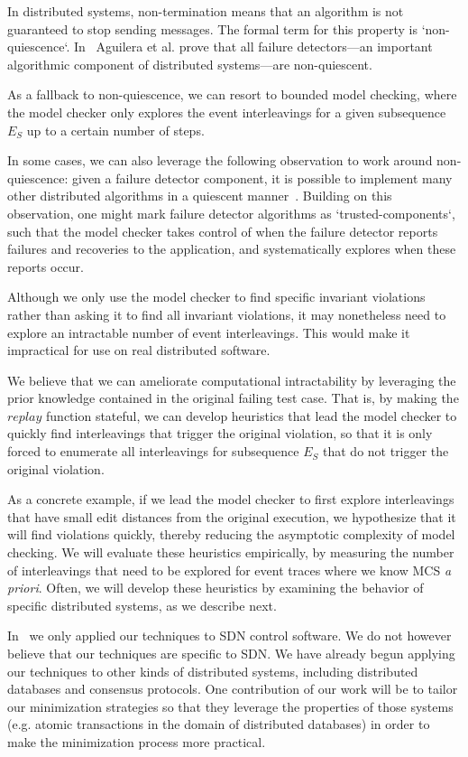 In distributed systems, non-termination means that an algorithm is not guaranteed to stop
sending messages. The formal term for this property is `non-quiescence`. In~\cite{aguilera1997heartbeat} Aguilera et al. prove that
all failure detectors---an important algorithmic component of distributed systems---are
non-quiescent.

As a fallback to non-quiescence, we can resort to
bounded model checking, where the model checker only explores the event
interleavings for a given subsequence $E_S$ up to a certain number of steps.

In some cases, we can also leverage the following observation to work around
non-quiescence:
given a failure detector component, it is possible to implement many other
distributed algorithms in a quiescent manner~\cite{aguilera1997heartbeat}. Building on this observation,
one might mark failure detector algorithms as `trusted-components`,
such that the model checker takes control of when the failure detector reports
failures and recoveries to the application, and systematically explores when
these reports occur.

 Although we only use the
model checker to find specific invariant violations rather than asking it to
find all invariant violations, it may nonetheless need to explore an
intractable number of event interleavings. This would make it impractical for
use on real distributed software.

We believe that we can ameliorate computational intractability by
leveraging the prior knowledge contained in the original failing test case.
That is, by making the $replay$ function stateful, we can develop heuristics that lead the
model checker to quickly find interleavings that trigger the original violation, so that
it is only forced to enumerate all interleavings for subsequence $E_S$ that do
not trigger the original violation.

As a concrete example, if we lead
the model checker to first explore interleavings that have small edit
distances from the original execution, we hypothesize that it will find
violations quickly, thereby reducing the asymptotic complexity of model
checking. We will evaluate these heuristics empirically, by measuring the number of
interleavings that need to be explored for event traces where we know
MCS {\em a priori}. Often, we will develop these heuristics by examining the
behavior of specific distributed systems, as we describe next.

 In~\cite{sts2014} we
only applied our techniques to SDN control software. We do not however believe
that our techniques are specific to SDN. We have already begun applying our
techniques to other kinds of distributed systems, including distributed
databases and consensus protocols. One contribution of our work will be to
tailor our minimization strategies so that they
leverage the properties of those systems (e.g. atomic transactions in the
domain of distributed databases) in
order to make the minimization process more practical.

